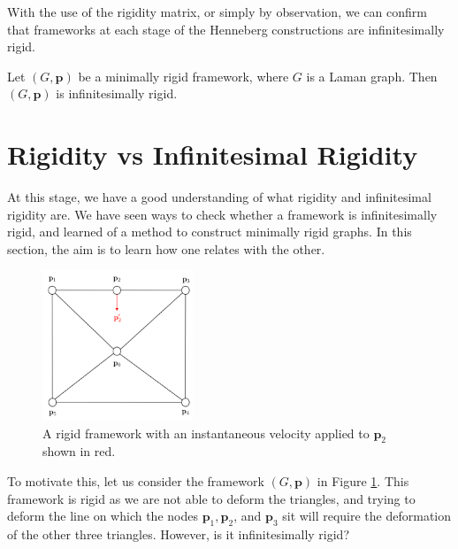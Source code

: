 \begin{flushleft}
With the use of the rigidity matrix, or simply by observation, we can confirm that frameworks at each stage of the Henneberg constructions are infinitesimally rigid. 
\end{flushleft}

\begin{corollary}
\label{cor: laman => inf rigid}
Let $(G,\mathbf{p})$ be a minimally rigid framework, where $G$ is a Laman graph. Then $(G,\mathbf{p})$ is infinitesimally rigid.
\end{corollary}

\section{Rigidity vs Infinitesimal Rigidity} 

\begin{flushleft}
At this stage, we have a good understanding of what rigidity and infinitesimal rigidity are. We have seen ways to check whether a framework is infinitesimally rigid, and learned of a method to construct minimally rigid graphs. In this section, the aim is to learn how one relates with the other. 
\end{flushleft}

\begin{figure}[htbp]
    \centering
    \includegraphics[width = 0.4\textwidth]{Chapter 3/6. rigid but not inf rigid.png}
    \caption{A rigid framework with an instantaneous velocity applied to $\mathbf{p}_2$ shown in red.}
    \label{fig: rigid but not inf rigid}
\end{figure}
\vspace{-4 mm}
\begin{flushleft}
To motivate this, let us consider the framework $(G,\mathbf{p})$ in Figure \ref{fig: rigid but not inf rigid}. This framework is rigid as we are not able to deform the triangles, and trying to deform the line on which the nodes $\mathbf{p}_1, \mathbf{p}_2$, and $\mathbf{p}_3$ sit will require the deformation of the other three triangles. However, is it infinitesimally rigid?
\end{flushleft}

